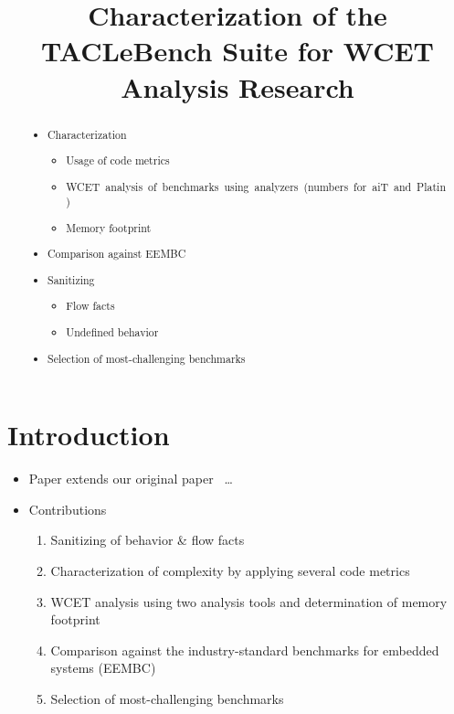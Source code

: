 \documentclass[a4paper,USenglish]{lites}
\title{Characterization of the TACLeBench Suite for WCET Analysis Research%
}
\author[1]{}
\begin{document}
\maketitle

\begin{abstract}


\begin{minipage}{0.6\textwidth}
\begin{itemize}
  \item Characterization
  \begin{itemize}
    \item Usage of code metrics
    \item \mbox{WCET analysis of benchmarks using analyzers (numbers for aiT and Platin)}
    \item Memory footprint
  \end{itemize}
  \item Comparison against EEMBC
  \item Sanitizing
  \begin{itemize}
    \item Flow facts
    \item Undefined behavior
  \end{itemize}
  \item Selection of most-challenging benchmarks
\end{itemize}
\end{minipage}

\end{abstract}

\section{Introduction}
\begin{itemize}
  \item Paper extends our original paper~\cite{Falk:2016:wcet} \dots
  \item Contributions
  \begin{enumerate}
    \item Sanitizing of behavior \& flow facts
    \item Characterization of complexity by applying several code metrics
    \item WCET analysis using two analysis tools and determination of memory footprint
    \item Comparison against the industry-standard benchmarks for embedded systems (EEMBC)
    \item Selection of most-challenging benchmarks
  \end{enumerate}
\end{itemize}
\end{document}
